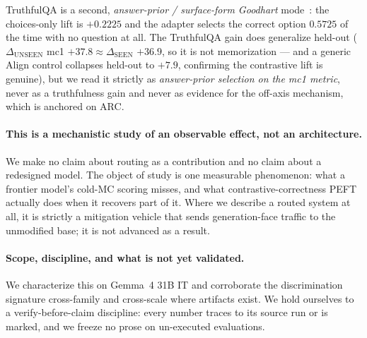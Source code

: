 TruthfulQA is a second, \emph{answer-prior / surface-form Goodhart} mode~\citep{ShortcutLearning,RightForWrongReasons,AnnotationArtifacts}: the
choices-only lift is $+0.2225$ and the adapter selects the correct option $0.5725$
of the time with no question at all. The TruthfulQA gain does generalize held-out
($\Delta_{\mathrm{UNSEEN}}$ mc1 $+37.8 \approx \Delta_{\mathrm{SEEN}}$ $+36.9$, so
it is not memorization --- and a generic Align control collapses held-out to $+7.9$,
confirming the contrastive lift is genuine), but we read it strictly as
\emph{answer-prior selection on the mc1 metric}, never as a truthfulness gain and
never as evidence for the off-axis mechanism, which is anchored on ARC.

\paragraph{This is a mechanistic study of an observable effect, not an
architecture.}
We make no claim about routing as a contribution and no claim about a redesigned
model. The object of study is one measurable phenomenon: what a frontier model's
cold-MC scoring misses, and what contrastive-correctness PEFT actually does when it
recovers part of it. Where we describe a routed system at all, it is strictly a
mitigation vehicle that sends generation-face traffic to the unmodified base; it is
not advanced as a result.

\paragraph{Scope, discipline, and what is not yet validated.}
We characterize this on Gemma~4 31B IT and corroborate the discrimination signature
cross-family and cross-scale where artifacts exist. We hold ourselves to a
verify-before-claim discipline: every number traces to its source run or is marked,
and we freeze no prose on un-executed evaluations.

